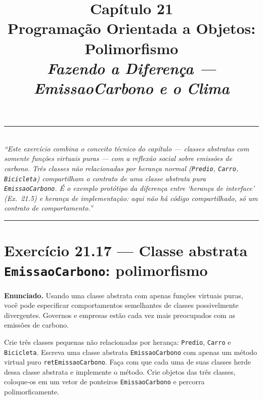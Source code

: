\documentclass[11pt,a4paper]{article}
\title{
  \vspace{-1cm}
  {\Huge\bfseries\color{deitelblue} Cap\'itulo 21}\\[0.3em]
  {\Large\bfseries Programa\c{c}\~ao Orientada a Objetos: Polimorfismo}\\[0.8em]
  {\large\itshape Fazendo a Diferen\c{c}a --- EmissaoCarbono e o Clima}
}
\author{}
\date{}
\begin{document}
\maketitle
\thispagestyle{empty}
\vspace{-2em}

\begin{center}
\rule{0.85\textwidth}{0.5pt}\\[0.4em]
\textit{``Este exerc\'icio combina o conceito t\'ecnico do cap\'itulo --- classes abstratas com somente fun\c{c}\~oes virtuais puras --- com a reflex\~ao social sobre emiss\~oes de carbono. Tr\^es classes \emph{n\~ao relacionadas por heran\c{c}a normal} (\texttt{Predio}, \texttt{Carro}, \texttt{Bicicleta}) compartilham o contrato de uma classe abstrata pura \texttt{EmissaoCarbono}. \'E o exemplo prot\'otipo da diferen\c{c}a entre `heran\c{c}a de interface' (Ex.~21.5) e heran\c{c}a de implementa\c{c}\~ao: aqui n\~ao h\'a c\'odigo compartilhado, s\'o um \emph{contrato} de comportamento.''}\\[0.4em]
\rule{0.85\textwidth}{0.5pt}
\end{center}

\vspace{1em}

\section{Exerc\'icio 21.17 --- Classe abstrata \texttt{EmissaoCarbono}: polimorfismo}

\begin{enunciado}
\textbf{Enunciado.} Usando uma classe abstrata com apenas fun\c{c}\~oes virtuais puras, voc\^e pode especificar comportamentos semelhantes de classes possivelmente divergentes. Governos e empresas est\~ao cada vez mais preocupados com as emiss\~oes de carbono.

Crie tr\^es classes pequenas n\~ao relacionadas por heran\c{c}a: \texttt{Predio}, \texttt{Carro} e \texttt{Bicicleta}. Escreva uma classe abstrata \texttt{EmissaoCarbono} com apenas um m\'etodo virtual puro \texttt{retEmissaoCarbono}. Fa\c{c}a com que cada uma de suas classes herde dessa classe abstrata e implemente o m\'etodo. Crie objetos das tr\^es classes, coloque-os em um vetor de ponteiros \texttt{EmissaoCarbono} e percorra polimorficamente.
\end{enunciado}
\end{document}
